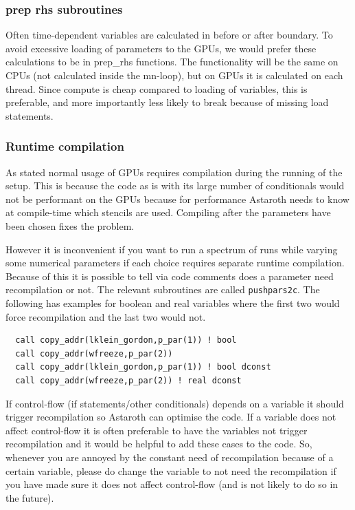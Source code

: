 \documentclass[\mydriver,12pt,twoside,notitlepage,a4paper]{article}
\newcommand{\code}[1]{\texttt{#1}}
\begin{document}
\subsubsection{prep rhs subroutines}
Often time-dependent variables are calculated in before or after boundary.
To avoid excessive loading of parameters to the GPUs, we would prefer these calculations to be in prep\_rhs functions.
The functionality will be the same on CPUs (not calculated inside the mn-loop), but on GPUs it is calculated on each thread.
Since compute is cheap compared to loading of variables, this is preferable, and more importantly less likely to break because of missing load statements.

\subsubsection{Runtime compilation}
\label{runtime-compilation}
As stated normal usage of GPUs requires compilation during the running of the setup.
This is because the code as is with its large number of conditionals would not be performant on the GPUs because for performance Astaroth needs to know at compile-time which stencils are used. Compiling after the parameters have been chosen fixes the problem. 

However it is inconvenient if you want to run a spectrum of runs while varying some numerical parameters if each choice requires separate runtime compilation. Because of this it is possible to tell via code comments does a parameter need recompilation or not.
The relevant subroutines are called \code{pushpars2c}. The following has examples for boolean and real variables where the first two would force recompilation and the last two would not.
\begin{verbatim}
  call copy_addr(lklein_gordon,p_par(1)) ! bool
  call copy_addr(wfreeze,p_par(2))
  call copy_addr(lklein_gordon,p_par(1)) ! bool dconst
  call copy_addr(wfreeze,p_par(2)) ! real dconst
\end{verbatim}

If control-flow (if statements/other conditionals) depends on a variable it should trigger recompilation so Astaroth can optimise the code.
If a variable does not affect control-flow it is often preferable to have the variables not trigger recompilation and it would be helpful to add these cases to the code. So, whenever you are annoyed by the constant need of recompilation because of a certain variable, please do change the variable to not need the recompilation if you have made sure it does not affect control-flow (and is not likely to do so in the future).
\end{document}
